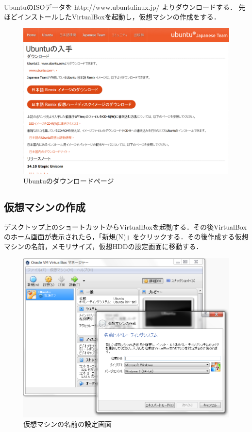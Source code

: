 UbuntuのISOデータを http://www.ubuntulinux.jp/ よりダウンロードする．
先ほどインストールしたVirtualBoxを起動し，仮想マシンの作成をする．

\begin{figure}[htb]
\centering
\includegraphics[width=15cm]{ubuntuinst.png}
\caption{Ubuntuのダウンロードページ}\label{Ubuntuのダウンロードページ}
\end{figure}

\clearpage

\subsection{仮想マシンの作成}

デスクトップ上のショートカットからVirtualBoxを起動する．その後VirtualBoxのホーム画面が表示されたら，「新規(N)」をクリックする．その後作成する仮想マシンの名前，メモリサイズ，仮想HDDの設定画面に移動する．

\begin{figure}[htb]
\centering
\includegraphics[width=15cm]{vb1.png}
\caption{仮想マシンの名前の設定画面}\label{仮想マシンの設定画面}
\end{figure}
\clearpage


